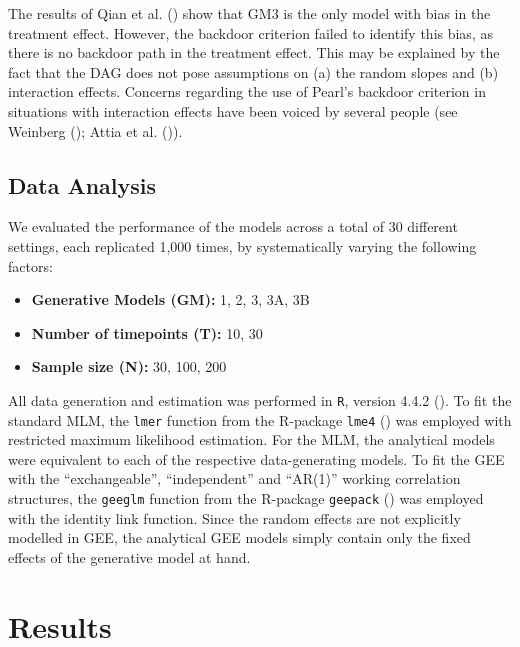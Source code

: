 \documentclass[
  12pt,
  a4paper,
]{article}
\begin{document}
The results of Qian et al. () show that GM3
is the only model with bias in the treatment effect. However, the
backdoor criterion failed to identify this bias, as there is no backdoor
path in the treatment effect. This may be explained by the fact that the
DAG does not pose assumptions on (a) the random slopes and (b)
interaction effects. Concerns regarding the use of Pearl's backdoor
criterion in situations with interaction effects have been voiced by
several people (see Weinberg (); Attia
et al. ()).

\subsection{Data Analysis}\label{data-analysis}

We evaluated the performance of the models across a total of 30
different settings, each replicated 1,000 times, by systematically
varying the following factors:

\begin{itemize}
\item
  \textbf{Generative Models (GM):} 1, 2, 3, 3A, 3B
\item
  \textbf{Number of timepoints (T):} 10, 30
\item
  \textbf{Sample size (N):} 30, 100, 200
\end{itemize}

All data generation and estimation was performed in \texttt{R}, version
4.4.2 (). To fit the standard
MLM, the \texttt{lmer} function from the R-package \texttt{lme4}
() was employed with
restricted maximum likelihood estimation. For the MLM, the analytical
models were equivalent to each of the respective data-generating models.
To fit the GEE with the ``exchangeable'', ``independent'' and ``AR(1)''
working correlation structures, the \texttt{geeglm} function from the
R-package \texttt{geepack} () was employed with the identity link function. Since the random
effects are not explicitly modelled in GEE, the analytical GEE models
simply contain only the fixed effects of the generative model at hand.

\section{Results}\label{results}
\end{document}
